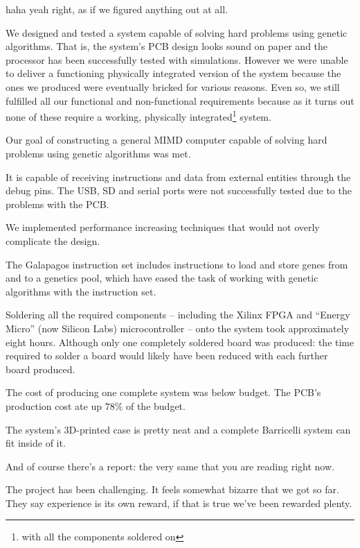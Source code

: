 haha yeah right, as if we figured anything out at all.




We designed and tested a system capable of solving hard problems using genetic algorithms.
That is, the system's PCB design looks sound on paper and the processor has been successfully tested with simulations.
However we were unable to deliver a functioning physically integrated version of the system because the ones we produced were eventually bricked for various reasons.
Even so, we still fulfilled all our functional and non-functional requirements because as it turns out none of these require a working, physically integrated\footnote{with all the components soldered on} system.

Our goal of constructing a general MIMD computer capable of solving hard problems using genetic algorithms was met.

It is capable of receiving instructions and data from external entities through the debug pins.
The USB, SD and serial ports were not successfully tested due to the problems with the PCB.

We implemented performance increasing techniques that would not overly complicate the design.

The Galapagos instruction set includes instructions to load and store genes from and to a genetics pool, which have eased the task of working with genetic algorithms with the instruction set.


Soldering all the required components -- including the Xilinx FPGA and ``Energy Micro'' (now Silicon Labs) microcontroller --  onto the system took approximately eight hours.
Although only one completely soldered board was produced: the time required to solder a board would likely have been reduced with each further board produced.

The cost of producing one complete system was below budget.
The PCB's production cost ate up $78\%$ of the budget.

The system's 3D-printed case is pretty neat and a complete Barricelli system can fit inside of it. 


And of course there's a report: the very same that you are reading right now.

The project has been challenging.
It feels somewhat bizarre that we got so far.
They say experience is its own reward, if that is true we've been rewarded plenty.

